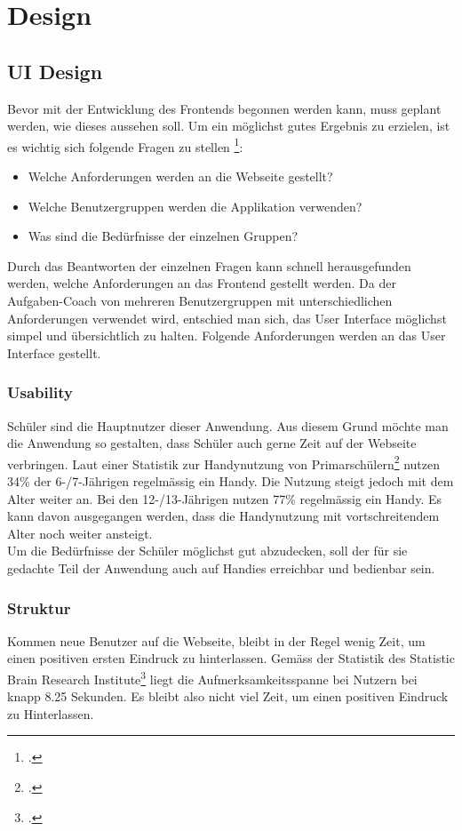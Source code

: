 \section{Design}
\subsection{UI Design}
Bevor mit der Entwicklung des Frontends begonnen werden kann, muss geplant werden, wie dieses aussehen soll. Um ein möglichst gutes Ergebnis zu erzielen, ist es wichtig sich folgende Fragen zu stellen \footcite{ui_design_questions}:

\begin{itemize}
	\item Welche Anforderungen werden an die Webseite gestellt?
	\item Welche Benutzergruppen werden die Applikation verwenden?
	\item Was sind die Bedürfnisse der einzelnen Gruppen?
\end{itemize}

Durch das Beantworten der einzelnen Fragen kann schnell herausgefunden werden, welche Anforderungen an das Frontend gestellt werden. Da der Aufgaben-Coach von mehreren Benutzergruppen mit unterschiedlichen Anforderungen verwendet wird, entschied man sich, das User Interface möglichst simpel und übersichtlich zu halten. Folgende Anforderungen werden an das User Interface gestellt.

\subsubsection*{Usability}
Schüler sind die Hauptnutzer dieser Anwendung. Aus diesem Grund möchte man die Anwendung so gestalten, dass Schüler auch gerne Zeit auf der Webseite verbringen. Laut einer Statistik zur Handynutzung von Primarschülern\footcite{smartphone_usage} nutzen 34\% der 6-/7-Jährigen regelmässig ein Handy. Die Nutzung steigt jedoch mit dem Alter weiter an. Bei den 12-/13-Jährigen nutzen 77\% regelmässig ein Handy. Es kann davon ausgegangen werden, dass die Handynutzung mit vortschreitendem Alter noch weiter ansteigt. \\

Um die Bedürfnisse der Schüler möglichst gut abzudecken, soll der für sie gedachte Teil der Anwendung auch auf Handies erreichbar und bedienbar sein.


\subsubsection*{Struktur}
Kommen neue Benutzer auf die Webseite, bleibt in der Regel wenig Zeit, um einen positiven ersten Eindruck zu hinterlassen. Gemäss der Statistik des Statistic Brain Research Institute\footcite{attention_span_statistic} liegt die Aufmerksamkeitsspanne bei Nutzern bei knapp 8.25 Sekunden. Es bleibt also nicht viel Zeit, um einen positiven Eindruck zu Hinterlassen. \\

